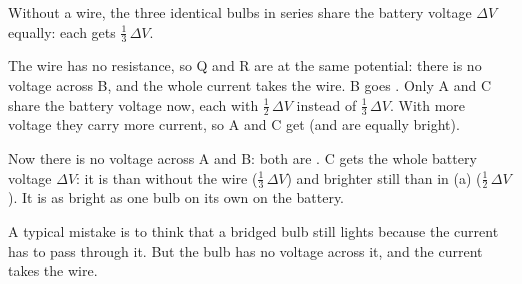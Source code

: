 Without a wire, the three identical bulbs in series share the battery voltage $\Delta V$ equally: each gets $\frac{1}{3}\,\Delta V$.

\begin{abcliste}
\abc The wire has no resistance, so Q and R are at the same potential: there is no voltage across B, and the whole current takes the wire. B goes . Only A and C share the battery voltage now, each with $\frac{1}{2}\,\Delta V$ instead of $\frac{1}{3}\,\Delta V$. With more voltage they carry more current, so A and C get  (and are equally bright).

\abc Now there is no voltage across A and B: both are . C gets the whole battery voltage $\Delta V$: it is  than without the wire ($\frac{1}{3}\,\Delta V$) and brighter still than in (a) ($\frac{1}{2}\,\Delta V$). It is as bright as one bulb on its own on the battery.
\end{abcliste}

A typical mistake is to think that a bridged bulb still lights because the current has to pass through it. But the bulb has no voltage across it, and the current takes the wire.
